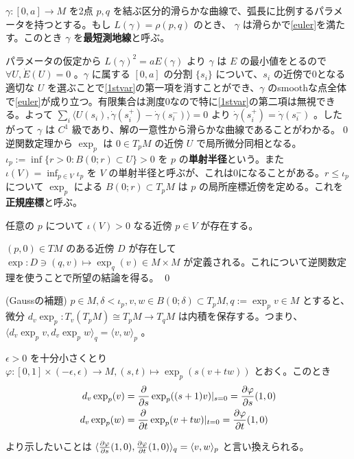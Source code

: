 \documentclass[dvipdfmx,a4paper]{jsreport}
\theoremstyle{definition}
\newcommand{\der}{\partial}
\renewcommand{\phi}{\varphi}
\begin{document}
\lem $\gamma:[0,a]\to M$ を2点 $p,q$ を結ぶ区分的滑らかな曲線で、弧長に比例するパラメータを持つとする。もし $L(\gamma)=\rho(p,q)$ のとき、 $\gamma$ は滑らかで\eqref{euler}を満たす。このとき $\gamma$ を\textbf{最短測地線}と呼ぶ。

\prf パラメータの仮定から $L(\gamma)^2=aE(\gamma)$ より $\gamma$ は $E$ の最小値をとるので $\forall U,\dot{E}(U)=0$ 。$\gamma$ に属する $[0,a]$ の分割 $\{s_i\}$ について、$s_i$ の近傍で0となる適切な $U$ を選ぶことで\eqref{1stvar}の第一項を消すことができ、$\gamma$ のsmoothな点全体で\eqref{euler}が成り立つ。有限集合は測度0なので特に\eqref{1stvar}の第二項は無視できる。よって $\sum_i \langle U(s_i),\dot{\gamma}(s_i^+)-\dot{\gamma}(s_i^-) \rangle=0$ より $\dot{\gamma}(s_i^+)=\dot{\gamma}(s_i^-)$ 。したがって $\gamma$ は $C^1$ 級であり、解の一意性から滑らかな曲線であることがわかる。\qed \\


逆関数定理から $\exp_p$ は $0 \in T_pM$ の近傍 $U$ で局所微分同相となる。$\iota_p:=\inf\{r>0 \colon B(0;r) \subset U\}>0$ を $p$ の\textbf{単射半径}という。また $\iota(V)=\inf_{p \in V} \iota_p$ を $V$ の単射半径と呼ぶが、これは0になることがある。$r \leq \iota_p$ について $\exp_p$ による $B(0;r) \subset T_pM$ は $p$ の局所座標近傍を定める。これを\textbf{正規座標}と呼ぶ。


\lem\label{lemrad} 任意の $p$ について $\iota(V)>0$ なる近傍 $p \in V$ が存在する。

\prf $(p,0) \in TM$ のある近傍 $D$ が存在して $\exp:D \ni (q,v) \mapsto \exp_q(v) \in M \times M$ が定義される。これについて逆関数定理を使うことで所望の結論を得る。 \qed


\lem\label{lemgauss} (Gaussの補題) $p \in M,\delta<\iota_p,v,w \in B(0;\delta) \subset T_pM,q:=\exp_p v \in M$ とすると、微分 $d_v\exp_p:T_v(T_pM) \cong T_pM \to T_qM$ は内積を保存する。つまり、 $\langle d_v\exp_p v,d_v\exp_p w \rangle_q=\langle v,w \rangle_p$ 。

\prf $\epsilon>0$ を十分小さくとり $\phi:[0,1] \times (-\epsilon,\epsilon) \to M,(s,t) \mapsto \exp_p(s(v+tw))$ とおく。このとき
\begin{align*}
    d_v \exp_p(v)&= {\der \over \der s}\exp_p((s+1)v)|_{s=0}={\der \phi \over \der s}(1,0) \\
    d_v \exp_p(w)&= {\der \over \der t}\exp_p(v+tw)|_{t=0}={\der \phi \over \der t}(1,0)
\end{align*}

より示したいことは $\langle {\der \phi \over \der s}(1,0),{\der \phi \over \der t}(1,0) \rangle_q=\langle v,w \rangle_p$ と言い換えられる。
\end{document}
